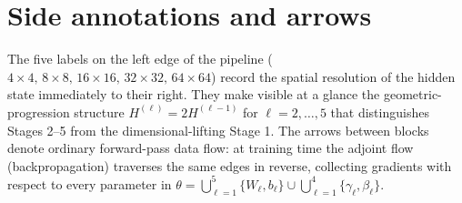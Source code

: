 \section*{Side annotations and arrows}

The five labels on the left edge of the pipeline ($4 \times 4,\,
8 \times 8,\, 16 \times 16,\, 32 \times 32,\, 64 \times 64$) record the
spatial resolution of the hidden state immediately to their right. They
make visible at a glance the geometric-progression structure
$H^{(\ell)} = 2 H^{(\ell-1)}$ for $\ell = 2, \ldots, 5$ that
distinguishes Stages 2--5 from the dimensional-lifting Stage 1. The
arrows between blocks denote ordinary forward-pass data flow: at
training time the adjoint flow (backpropagation) traverses the same
edges in reverse, collecting gradients with respect to every parameter
in $\theta = \bigcup_{\ell=1}^{5}\{W_\ell, b_\ell\} \cup
\bigcup_{\ell=1}^{4}\{\gamma_\ell, \beta_\ell\}$.
